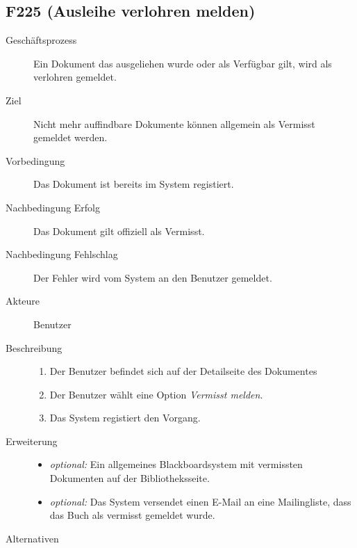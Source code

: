 \subsection{F225 (Ausleihe verlohren melden)}
\begin{description}
  \item[Geschäftsprozess]Ein Dokument das ausgeliehen wurde oder als Verfügbar gilt, wird als verlohren gemeldet.
  \item[Ziel]Nicht mehr auffindbare Dokumente können allgemein als Vermisst gemeldet werden.
  \item[Vorbedingung]Das Dokument ist bereits im System registiert.
  \item[Nachbedingung Erfolg]Das Dokument gilt offiziell als Vermisst.
  \item[Nachbedingung Fehlschlag]Der Fehler wird vom System an den Benutzer gemeldet.
  \item[Akteure]Benutzer
  \item[Beschreibung]\hfill
    \begin{enumerate}
      \item Der Benutzer befindet sich auf der Detailseite des Dokumentes
      \item Der Benutzer wählt eine Option \emph{Vermisst melden}.
      \item Das System registiert den Vorgang.
    \end{enumerate}
  \item[Erweiterung]\hfill
    \begin{itemize}
      \item \emph{optional:} Ein allgemeines Blackboardsystem mit vermissten Dokumenten auf der Bibliotheksseite.
      \item \emph{optional:} Das System versendet einen E-Mail an eine Mailingliste, dass das Buch als vermisst gemeldet wurde.
    \end{itemize}
  \item[Alternativen]
\end{description}

